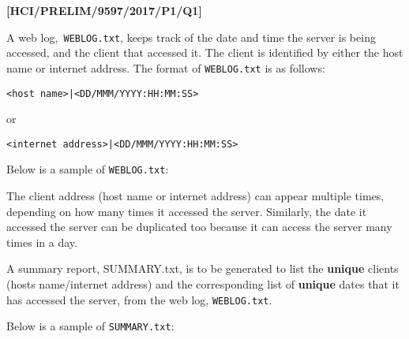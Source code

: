 \item \textbf{{[}HCI/PRELIM/9597/2017/P1/Q1{]} }

A web log,\texttt{ WEBLOG.txt}, keeps track of the date and time the
server is being accessed, and the client that accessed it. The client
is identified by either the host name or internet address. The format
of \texttt{WEBLOG.txt} is as follows: 
\noindent \begin{center}
\texttt{<host name>|<DD/MMM/YYYY:HH:MM:SS> }
\par\end{center}

or
\noindent \begin{center}
\texttt{<internet address>|<DD/MMM/YYYY:HH:MM:SS> }
\par\end{center}

Below is a sample of \texttt{WEBLOG.txt}: 

\noindent{}

The client address (host name or internet address) can appear multiple
times, depending on how many times it accessed the server. Similarly,
the date it accessed the server can be duplicated too because it can
access the server many times in a day. 

A summary report, SUMMARY.txt, is to be generated to list the \textbf{unique}
clients (hosts name/internet address) and the corresponding list of
\textbf{unique} dates that it has accessed the server, from the web
log, \texttt{WEBLOG.txt}. 

Below is a sample of \texttt{SUMMARY.txt}: 

\noindent{}

